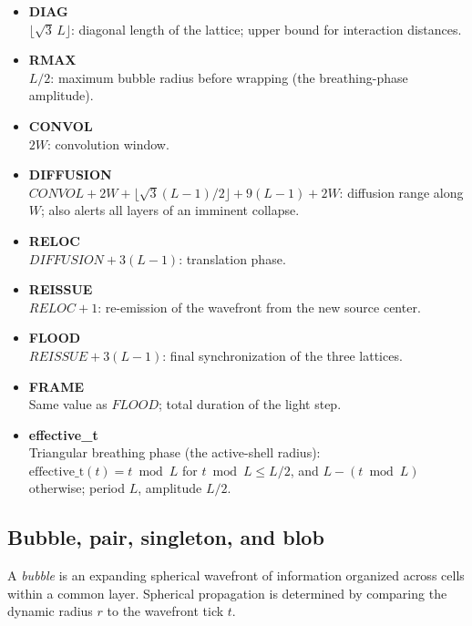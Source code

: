 \documentclass{ijuc}
\begin{document}
\begin{itemize}
\item \textbf{DIAG}\\
$\lfloor\sqrt{3}\,L\rfloor$: diagonal length of the lattice; upper bound for interaction distances.

\item \textbf{RMAX}\\
$L/2$: maximum bubble radius before wrapping (the breathing-phase amplitude).

\item \textbf{CONVOL}\\
$2W$: convolution window.

\item \textbf{DIFFUSION} \\
$CONVOL + 2W + \lfloor\sqrt{3}(L-1)/2\rfloor + 9(L-1) + 2W$: diffusion range along $W$; also alerts all layers of an imminent collapse.

\item \textbf{RELOC}\\
$DIFFUSION + 3(L-1)$: translation phase.

\item \textbf{REISSUE}\\
$RELOC + 1$: re-emission of the wavefront from the new source center.

\item \textbf{FLOOD}\\
$REISSUE + 3(L-1)$: final synchronization of the three lattices.

\item \textbf{FRAME}\\
Same value as $FLOOD$; total duration of the light step.

\item \textbf{effective\_t}\\
Triangular breathing phase (the active-shell radius): $\mathrm{effective\_t}(t)=t\bmod L$ for $t\bmod L\le L/2$, and $L-(t\bmod L)$ otherwise; period $L$, amplitude $L/2$.

\end{itemize}

\subsection{Bubble, pair, singleton, and blob} \label{subsec:pairs}

A \emph{bubble} is an expanding spherical wavefront of information organized across cells within a common layer. Spherical propagation is determined by comparing the dynamic radius $r$ to the wavefront tick $t$. 
\end{document}
